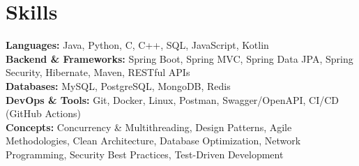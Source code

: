 \section{Skills}

\noindent\textbf{Languages:} Java, Python, C, C++, SQL, JavaScript, Kotlin\\[2pt]
\noindent\textbf{Backend \& Frameworks:} Spring Boot, Spring MVC, Spring Data JPA, Spring Security, Hibernate, Maven, RESTful APIs\\[2pt]
\noindent\textbf{Databases:} MySQL, PostgreSQL, MongoDB, Redis\\[2pt]
\noindent\textbf{DevOps \& Tools:} Git, Docker, Linux, Postman, Swagger/OpenAPI, CI/CD (GitHub Actions)\\[2pt]
\noindent\textbf{Concepts:} Concurrency \& Multithreading, Design Patterns, Agile Methodologies, Clean Architecture, Database Optimization, Network Programming, Security Best Practices, Test-Driven Development